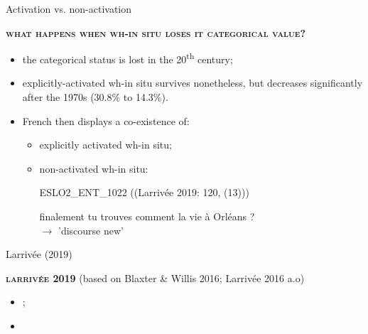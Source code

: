 \documentclass[lesson_slides]{subfiles}
\begin{document}
\begin{frame}[c]{Activation vs. non-activation}

    \noindent \textbf{\textsc{what happens when wh-in situ loses it categorical value?}}\\ \pause
    \begin{itemize}
        \item[\ding{227}] the categorical status is lost in the 20\textsuperscript{th} century; \pause
        \item[\ding{227}] explicitly-activated wh-in situ survives nonetheless, but decreases significantly after the 1970s (30.8\% to 14.3\%). \pause
    \item[\ding{227}] French then displays a co-existence of: \pause
    \begin{itemize}
        \item explicitly activated wh-in situ; \pause
        \item non-activated wh-in situ:
        \begin{exe}
        \ex ESLO2\_ENT\_1022 ((Larrivée 2019: 120, (13))) \pause
            \begin{xlist}
             finalement tu trouves comment la vie à Orléans ?\\ \pause
            $\longrightarrow$ 'discourse new'
            \end{xlist} 
            \end{exe}
    \end{itemize}
  \end{itemize}
\end{frame}
\begin{frame}[c]{Larrivée (2019)}

    \noindent \textbf{\textsc{larrivée 2019}} \pause (based on Blaxter & Willis 2016; Larrivée 2016 a.o) \pause
    \begin{itemize}
        \item[\ding{227}] ; \pause
        \item[\ding{227}] 
    \end{itemize}
  
\end{frame}
\end{document}
